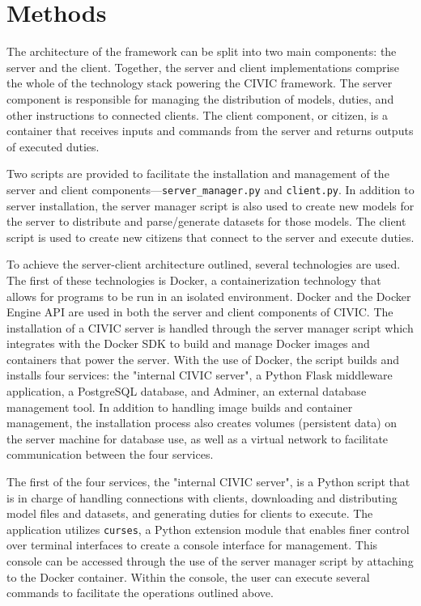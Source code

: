 \documentclass[11pt]{article}
\begin{document}
\section{Methods}

The architecture of the framework can be split into two main components: the server and the client. Together, the server and client implementations comprise the whole of the technology stack powering the CIVIC framework. The server component is responsible for managing the distribution of models, duties, and other instructions to connected clients. The client component, or citizen, is a container that receives inputs and commands from the server and returns outputs of executed duties.

Two scripts are provided to facilitate the installation and management of the server and client components---\verb|server_manager.py| and \verb|client.py|. In addition to server installation, the server manager script is also used to create new models for the server to distribute and parse/generate datasets for those models. The client script is used to create new citizens that connect to the server and execute duties.

To achieve the server-client architecture outlined, several technologies are used. The first of these technologies is Docker, a containerization technology that allows for programs to be run in an isolated environment. Docker and the Docker Engine API are used in both the server and client components of CIVIC. The installation of a CIVIC server is handled through the server manager script which integrates with the Docker SDK to build and manage Docker images and containers that power the server. With the use of Docker, the script builds and installs four services: the "internal CIVIC server", a Python Flask middleware application, a PostgreSQL database, and Adminer, an external database management tool. In addition to handling image builds and container management, the installation process also creates volumes (persistent data) on the server machine for database use, as well as a virtual network to facilitate communication between the four services. 

The first of the four services, the "internal CIVIC server", is a Python script that is in charge of handling connections with clients, downloading and distributing model files and datasets, and generating duties for clients to execute. The application utilizes \verb|curses|, a Python extension module that enables finer control over terminal interfaces to create a console interface for management. This console can be accessed through the use of the server manager script by attaching to the Docker container. Within the console, the user can execute several commands to facilitate the operations outlined above. 
\end{document}
